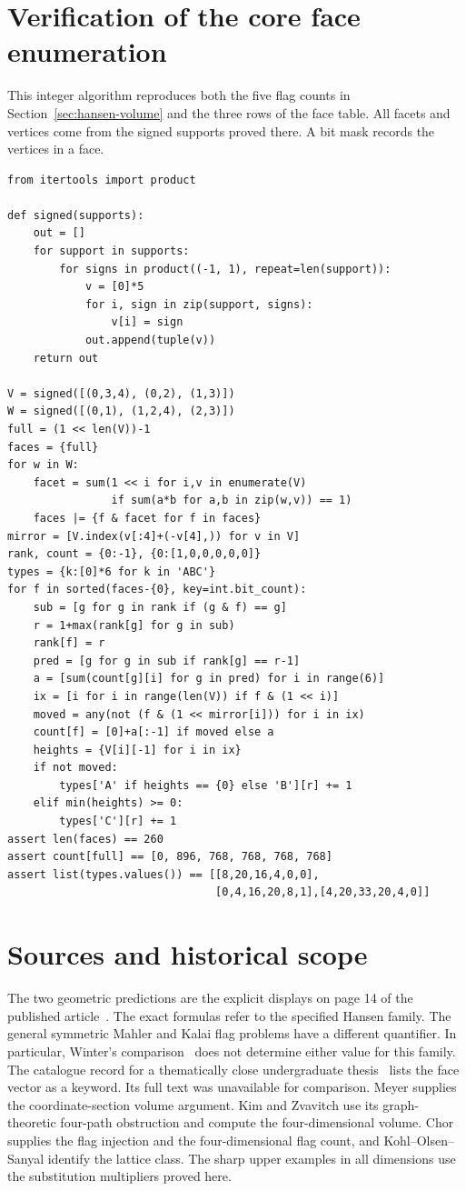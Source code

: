 \documentclass[11pt,a4paper]{article}
\numberwithin{equation}{section}
\begin{document}
\appendix\section{Verification of the core face enumeration}
This integer algorithm reproduces both the five flag counts in Section~\ref{sec:hansen-volume} and the three rows of the face table. All facets and vertices come from the signed supports proved there. A bit mask records the vertices in a face.
\begingroup\small
\begin{verbatim}
from itertools import product

def signed(supports):
    out = []
    for support in supports:
        for signs in product((-1, 1), repeat=len(support)):
            v = [0]*5
            for i, sign in zip(support, signs):
                v[i] = sign
            out.append(tuple(v))
    return out

V = signed([(0,3,4), (0,2), (1,3)])
W = signed([(0,1), (1,2,4), (2,3)])
full = (1 << len(V))-1
faces = {full}
for w in W:
    facet = sum(1 << i for i,v in enumerate(V)
                if sum(a*b for a,b in zip(w,v)) == 1)
    faces |= {f & facet for f in faces}
mirror = [V.index(v[:4]+(-v[4],)) for v in V]
rank, count = {0:-1}, {0:[1,0,0,0,0,0]}
types = {k:[0]*6 for k in 'ABC'}
for f in sorted(faces-{0}, key=int.bit_count):
    sub = [g for g in rank if (g & f) == g]
    r = 1+max(rank[g] for g in sub)
    rank[f] = r
    pred = [g for g in sub if rank[g] == r-1]
    a = [sum(count[g][i] for g in pred) for i in range(6)]
    ix = [i for i in range(len(V)) if f & (1 << i)]
    moved = any(not (f & (1 << mirror[i])) for i in ix)
    count[f] = [0]+a[:-1] if moved else a
    heights = {V[i][-1] for i in ix}
    if not moved:
        types['A' if heights == {0} else 'B'][r] += 1
    elif min(heights) >= 0:
        types['C'][r] += 1
assert len(faces) == 260
assert count[full] == [0, 896, 768, 768, 768, 768]
assert list(types.values()) == [[8,20,16,4,0,0],
                                [0,4,16,20,8,1],[4,20,33,20,4,0]]
\end{verbatim}
\endgroup

\section*{Sources and historical scope}
The two geometric predictions are the explicit displays on page 14 of the published article~\cite{FHSZ}. The exact formulas refer to the specified Hansen family. The general symmetric Mahler and Kalai flag problems have a different quantifier. In particular, Winter's comparison~\cite{Winter} does not determine either value for this family. The catalogue record for a thematically close undergraduate thesis~\cite{Saarela} lists the face vector as a keyword. Its full text was unavailable for comparison. Meyer supplies the coordinate-section volume argument. Kim and Zvavitch use its graph-theoretic four-path obstruction and compute the four-dimensional volume. Chor supplies the flag injection and the four-dimensional flag count, and Kohl--Olsen--Sanyal identify the lattice class. The sharp upper examples in all dimensions use the substitution multipliers proved here.
 
\end{document}
